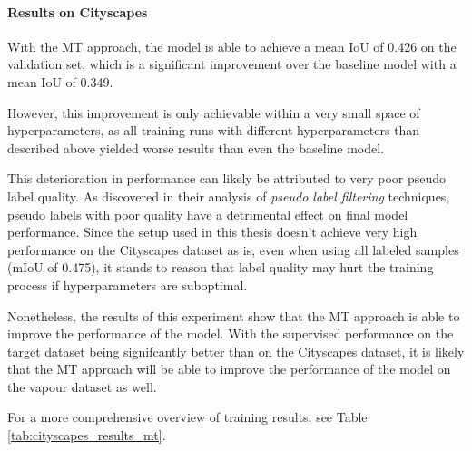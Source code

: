 \paragraph{Results on Cityscapes}
With the MT approach, the model is able to achieve a mean IoU of \num{0.426} on the validation set, which is a significant improvement over the baseline model with a mean IoU of \num{0.349}.

However, this improvement is only achievable within a very small space of hyperparameters, as all training runs with different hyperparameters than described above yielded worse results than even the baseline model.

This deterioration in performance can likely be attributed to very poor pseudo label quality. As \citeauthor{schererPseudoLabelNoiseSuppression2022}\cite{schererPseudoLabelNoiseSuppression2022} discovered in their analysis of \emph{pseudo label filtering} techniques, pseudo labels with poor quality have a detrimental effect on final model performance.
Since the setup used in this thesis doesn't achieve very high performance on the Cityscapes dataset as is, even when using all labeled samples (mIoU of \num{0.475}), it stands to reason that label quality may hurt the training process if hyperparameters are suboptimal.

Nonetheless, the results of this experiment show that the MT approach is able to improve the performance of the model. With the supervised performance on the target dataset being signifcantly better than on the Cityscapes dataset, it is likely that the MT approach will be able to improve the performance of the model on the vapour dataset as well.

For a more comprehensive overview of training results, see Table \ref{tab:cityscapes_results_mt}.

